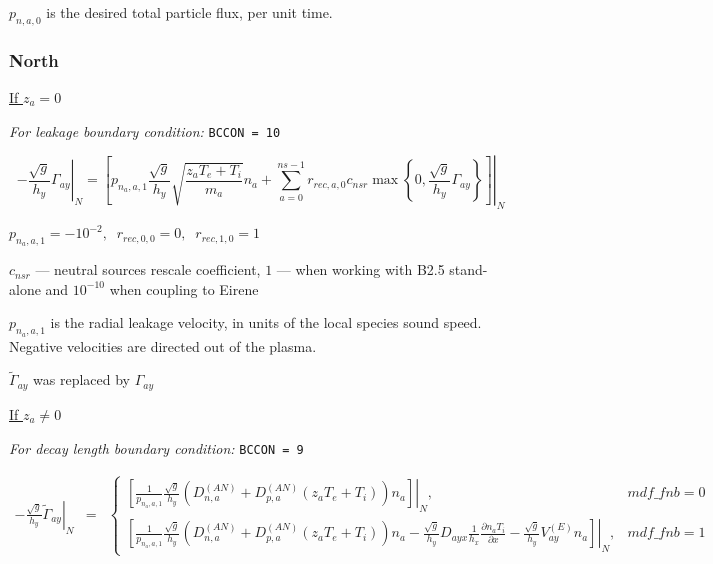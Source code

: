 \documentclass[a4paper,10pt]{report}
\begin{document}
$p_{n,a,0}$ is the desired total particle flux, per unit time.

\subsubsection{North}

\underline{If $z_a = 0$}

{\em For leakage boundary condition:} {\tt BCCON = 10}

\begin{equation}
\left. -\frac{\sqrt g}{h_y} \Gamma_{ay} \right|_{N}
=
\left. \left[
p_{n_a,a,1} \frac{\sqrt g}{h_y} \sqrt{\frac{z_a T_e + T_i}{m_a}} n_a
+
\sum \limits_{a=0}^{ns-1} r_{rec,a,0} c_{nsr}
\max \left\{0, \frac{\sqrt g}{h_y} \Gamma_{ay} \right\}
\right] \right|_{N}
\end{equation}

$p_{n_a,a,1} = -10^{-2}, \;\; r_{rec,0,0} = 0,\;\; r_{rec,1,0} = 1$

$c_{nsr}$ --- neutral sources rescale coefficient, $1$ --- when working with B2.5 stand-alone and $10^{-10}$ when coupling to Eirene

$p_{n_a,a,1}$ is the radial leakage velocity, in units of the local species sound speed. Negative velocities are directed out of the plasma.

$\widetilde{\Gamma}_{ay}$ was replaced by $\Gamma_{ay}$

\underline{If $z_a \neq 0$}

{\em For decay length boundary condition:} {\tt BCCON = 9}

\begin{equation}
\begin{matrix}
\left. -\frac{\sqrt g}{h_y} \widetilde{\Gamma}_{ay} \right|_{N}& =
& \left\{
\begin{matrix}
\left. \left[
	\frac 1{p_{n_a,a,1}} \frac{\sqrt g}{h_y}  \left(
		D^{(AN)}_{n,a} + D^{(AN)}_{p,a} \left(z_a T_e + T_i \right)
	\right) n_a
\right] \right|_{N}, & mdf\_fnb = 0
\\
\left. \left[
	\frac 1{p_{n_a,a,1}} \frac{\sqrt g}{h_y}  \left(
		D^{(AN)}_{n,a} + D^{(AN)}_{p,a} \left(z_a T_e + T_i \right)
	\right) n_a
	-
	\frac{\sqrt g}{h_y} D_{ayx} \frac1{h_x} \frac{\partial n_a T_i}{\partial x}
	-
	\frac{\sqrt g}{h_y} V_{ay}^{(E)} n_a
\right] \right|_{N}, & mdf\_fnb = 1
\end{matrix} \right.
\end{matrix}
\end{equation}
\end{document}
